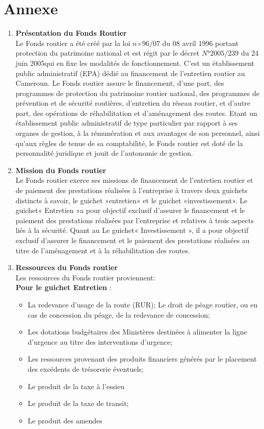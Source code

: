 \let\textcircled=\pgftextcircled
\chapter*{Annexe}
\label{chap:intro}
\begin{enumerate}
\item \textbf{Présentation du Fonds Routier}\\
Le Fonds routier a été créé par la loi $n\circ 96/07$  du 08 avril 
 1996 portant protection du patrimoine national et est régit par le décret $N°2005/239$ du 24 juin 2005qui en fixe les modalités de fonctionnement. C’est un établissement public administratif (EPA) dédié au financement de l’entretien routier au Cameroun. Le Fonds routier assure le financement, d’une part, des programmes de protection du patrimoine routier national, des programmes de prévention et de sécurité routières, d’entretien du réseau routier, et d’autre part, des opérations de réhabilitation et d’aménagement des routes. Etant un établissement public administratif de type particulier par rapport à ses organes de gestion, à la rémunération et aux avantages de son personnel, ainsi qu’aux règles de tenue de sa comptabilité, le Fonds routier est doté de la personnalité juridique et jouit de l’autonomie de gestion.
\vspace{1cm}
\item \textbf{Mission du Fonds routier}\\
Le Fonds routier exerce ses missions de financement de l’entretien routier et de
paiement des prestations réalisées à l’entreprise à travers deux guichets distincts à savoir, le
guichet «entretien» et le guichet «investissement». Le guichet« Entretien »a pour objectif exclusif d’assurer le financement et le paiement des prestations réalisées par l’entreprise et relatives à trois aspects liés à la sécurité. Quant au Le guichet« Investissement », il a pour objectif exclusif d’assurer le financement et le paiement des prestations réalisées au titre de
l’aménagement et à la réhabilitation des routes.
\vspace{1cm}
\item \textbf{Ressources du Fonds routier}\\
Les ressources du Fonds routier proviennent:\\
\textbf{Pour le guichet Entretien} :
\begin{itemize}
    \item  La redevance d’usage de la route (RUR);
 Le droit de péage routier, ou en cas de concession du péage, de la redevance de
concession;
 \item Les dotations budgétaires des Ministères destinées à alimenter la ligne d’urgence au titre des interventions d’urgence;
\item Les ressources provenant des produits financiers générés par le placement des
excédents de trésorerie éventuels;
\item Le produit de la taxe à l’essieu
\item Le produit de la taxe de transit;
\item Le produit des amendes
\end{itemize}



\end{enumerate}
